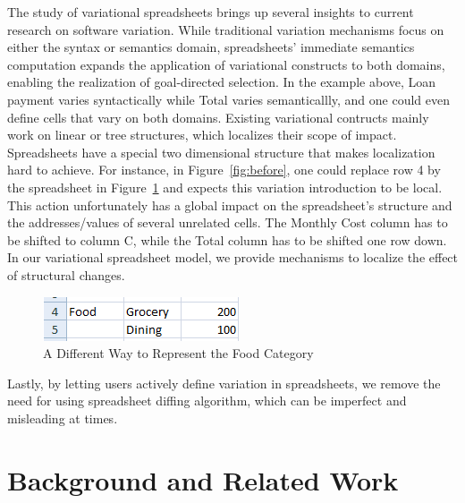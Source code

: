\documentclass[conference]{IEEEtran}
\newcommand{\figscale}{0.6}
\newcommand{\varsheet}{VarSheet}
\newcommand{\EUSES}{EUSES}
\newcommand{\gds}{goal-directed selection}
\begin{document}
The study of variational spreadsheets brings up several insights to
current research on software variation. While traditional variation
mechanisms focus on either the syntax or semantics domain, spreadsheets'
immediate semantics computation expands the application of variational
constructs to both domains, enabling the realization of \gds. In the
example above, Loan payment varies syntactically while Total varies
semanticallly, and one could even define cells that vary on both
domains.
%
Existing variational contructs mainly work on linear or tree structures,
which localizes their scope of impact. Spreadsheets have a special two
dimensional structure that makes localization hard to achieve. For
instance, in Figure~\ref{fig:before}, one could replace row 4 by the
spreadsheet in Figure~\ref{fig:food} and expects this variation
introduction to be local. This action unfortunately has a global impact
on the spreadsheet's structure and the addresses/values of several
unrelated cells. The Monthly Cost column has to be shifted to column C,
while the Total column has to be shifted one row down. In our
variational spreadsheet model, we provide mechanisms to localize the
effect of structural changes.

\begin{figure}
\centering
\includegraphics[scale=\figscale]{img/food}
\caption{A Different Way to Represent the Food Category}
\label{fig:food}
\end{figure}

Lastly, by letting users actively define variation in spreadsheets, we
remove the need for using spreadsheet diffing algorithm, which can be
imperfect and misleading at times.


\section{Background and Related Work}
\label{sec:background}
\end{document}
